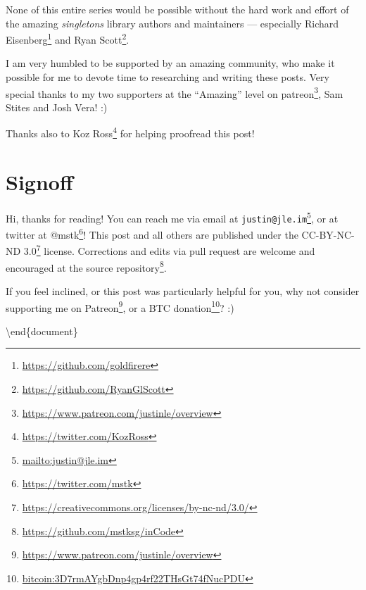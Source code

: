 \documentclass[]{article}
\renewcommand{\href}[2]{#2\footnote{\url{#1}}}
\begin{document}
None of this entire series would be possible without the hard work and effort of
the amazing \emph{singletons} library authors and maintainers --- especially
\href{https://github.com/goldfirere}{Richard Eisenberg} and
\href{https://github.com/RyanGlScott}{Ryan Scott}.

I am very humbled to be supported by an amazing community, who make it possible
for me to devote time to researching and writing these posts. Very special
thanks to my two supporters at the ``Amazing'' level on
\href{https://www.patreon.com/justinle/overview}{patreon}, Sam Stites and Josh
Vera! :)

Thanks also to \href{https://twitter.com/KozRoss}{Koz Ross} for helping
proofread this post!

\section{Signoff}\label{signoff}

Hi, thanks for reading! You can reach me via email at
\href{mailto:justin@jle.im}{\nolinkurl{justin@jle.im}}, or at twitter at
\href{https://twitter.com/mstk}{@mstk}! This post and all others are published
under the \href{https://creativecommons.org/licenses/by-nc-nd/3.0/}{CC-BY-NC-ND
3.0} license. Corrections and edits via pull request are welcome and encouraged
at \href{https://github.com/mstksg/inCode}{the source repository}.

If you feel inclined, or this post was particularly helpful for you, why not
consider \href{https://www.patreon.com/justinle/overview}{supporting me on
Patreon}, or a \href{bitcoin:3D7rmAYgbDnp4gp4rf22THsGt74fNucPDU}{BTC donation}?
:)

\textbackslash end\{document\}
\end{document}
